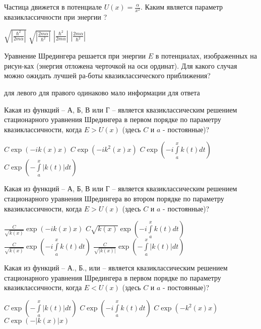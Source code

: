 \documentclass[11pt,a4paper]{exam}
\begin{document}
\begin{questions}
\question Частица движется в потенциале $U(x) = \frac{\alpha }{{{x^2}}}$. Каким является параметр квазиклассичности при энергии ?
\begin{choices}
\choice $\sqrt {\left| {\frac{{{\hbar ^2}}}{{2m\alpha }}} \right|} $      
\choice $\sqrt {\left| {\frac{{2m\alpha }}{{{\hbar ^2}}}} \right|} $      
\choice $\left| {\frac{{{\hbar ^2}}}{{2m\alpha }}} \right|$      
\choice $\left| {\frac{{2m\alpha }}{{{\hbar ^2}}}} \right|$
\end{choices}

\question Уравнение Шредингера решается при энергии $E$ в потенциалах, изображенных на рисун-ках (энергия отложена черточкой на оси ординат). Для какого случая можно ожидать лучшей ра-боты квазиклассического приближения?
\begin{choices}
\choice для левого        
\choice для правого
\choice одинаково         
\choice мало информации для ответа
\end{choices}

\question Какая из функций – А, Б, В или Г – является квазиклассическим решением стационарного уравнения Шредингера в первом порядке по параметру квазиклассичности, когда $E > U(x)$ (здесь $C$ и $a$ - постоянные)?  
\begin{choices}
\choice $C\exp \left( { - ik(x)x} \right)$   
\choice $C\exp \left( { - i{k^2}(x)x} \right)$    
\choice $C\exp \left( { - i\int\limits_a^x {k(t)dt} } \right)$       
\choice $C\exp \left( { - \int\limits_a^x {|k(t)|dt} } \right)$
\end{choices}

\question Какая из функций – А, Б, В или Г – является квазиклассическим решением стационарного уравнения Шредингера во втором порядке по параметру квазиклассичности, когда $E > U(x)$ (здесь $C$ и $a$ - постоянные)? 
\begin{choices}
\choice $\frac{C}{{\sqrt {k(x)} }}\exp \left( { - ik(x)x} \right)$         
\choice $C\sqrt {k(x)} \exp \left( { - i\int\limits_a^x {k(t)dt} } \right)$  
\choice $\frac{C}{{\sqrt {k(x)} }}\exp \left( { - i\int\limits_a^x {k(t)dt} } \right)$          
\choice $\frac{C}{{\sqrt {|k(x)|} }}\exp \left( { - \int\limits_a^x {|k(t)|dt} } \right)$
\end{choices}

\question Какая из функций – А., Б., или – является квазиклассическим решением стационарного уравнения Шредингера в первом порядке по параметру квазиклассичности, когда $E < U(x)$ (здесь $C$ и $a$ - постоянные)? 
\begin{choices} 
\choice $C\exp \left( { - \int\limits_a^x {|k(t)|dt} } \right)$  
\choice $C\exp \left( { - i\int\limits_a^x {k(t)dt} } \right)$      
\choice $C\exp \left( { - {k^2}(x)x} \right)$  
\choice $C\exp \left( { - |k(x)|x} \right)$
\end{choices}


\end{questions}
\end{document}
